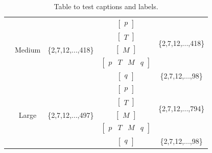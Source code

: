 \begin{table}[h!]
\begin{tabular}{c c c c c}
      & \multirow{5}{*}{Medium} & \multirow{5}{*}{\{2,7,12,...,418\}} & $\begin{bmatrix} p \end{bmatrix}$    & \multirow{4}{*}{\{2,7,12,...,418\}} \\ 
                            & &                                     & $\begin{bmatrix} T \end{bmatrix}$ & \\ 
                            & &                                     & $\begin{bmatrix} M \end{bmatrix}$       & \\ 
                            & &                                     & $\begin{bmatrix} p & T & M & q \end{bmatrix}$  & \\ \cline{4-5}
                            & &                                     & $\begin{bmatrix} q \end{bmatrix}$   & \{2,7,12,...,98\} \\ \cline{2-5}

     & \multirow{5}{*}{Large} & \multirow{5}{*}{\{2,7,12,...,497\}} & $\begin{bmatrix} p \end{bmatrix}$    & \multirow{4}{*}{\{2,7,12,...,794\}} \\ 
                            & &                                     & $\begin{bmatrix} T \end{bmatrix}$ & \\ 
                            & &                                     & $\begin{bmatrix} M \end{bmatrix}$        & \\ 
                            & &                                     & $\begin{bmatrix} p & T & M & q \end{bmatrix}$ & \\ \cline{4-5}
                            & &                                     & $\begin{bmatrix} q \end{bmatrix}$   & \{2,7,12,...,98\} \\
    \hline
    \end{tabular}
    \caption{Table to test captions and labels.}
    \label{table:1}
\end{table}


